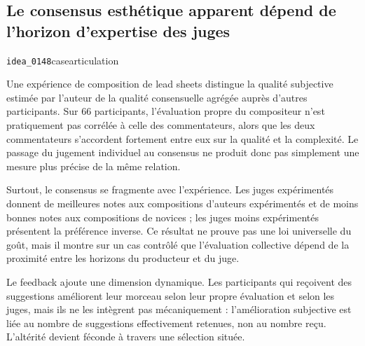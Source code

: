 \documentclass[10pt,a4paper]{article}
\begin{document}
\subsection{Le consensus esthétique apparent dépend de l'horizon d'expertise des juges}
{\small\color{metadata} \texttt{idea\_0148}\quad\textbullet\quad case\quad\textbullet\quad articulation\par}

Une expérience de composition de lead sheets distingue la qualité subjective estimée par l'auteur de la qualité consensuelle agrégée auprès d'autres participants. Sur 66 participants, l'évaluation propre du compositeur n'est pratiquement pas corrélée à celle des commentateurs, alors que les deux commentateurs s'accordent fortement entre eux sur la qualité et la complexité. Le passage du jugement individuel au consensus ne produit donc pas simplement une mesure plus précise de la même relation.

Surtout, le consensus se fragmente avec l'expérience. Les juges expérimentés donnent de meilleures notes aux compositions d'auteurs expérimentés et de moins bonnes notes aux compositions de novices ; les juges moins expérimentés présentent la préférence inverse. Ce résultat ne prouve pas une loi universelle du goût, mais il montre sur un cas contrôlé que l'évaluation collective dépend de la proximité entre les horizons du producteur et du juge.

Le feedback ajoute une dimension dynamique. Les participants qui reçoivent des suggestions améliorent leur morceau selon leur propre évaluation et selon les juges, mais ils ne les intègrent pas mécaniquement : l'amélioration subjective est liée au nombre de suggestions effectivement retenues, non au nombre reçu. L'altérité devient féconde à travers une sélection située.
\end{document}
